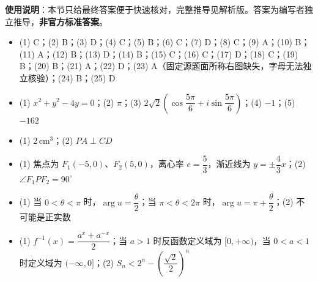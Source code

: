 
\begin{gknotice}
\textbf{使用说明}：本节只给最终答案便于快速核对，完整推导见解析版。答案为编写者独立推导，\textbf{非官方标准答案}。
\end{gknotice}

\begin{itemize}[leftmargin=2.6em]
  \item[\textbf{1.}] (1) C；(2) B；(3) D；(4) C；(5) B；(6) C；(7) D；(8) C；(9) A；(10) B；(11) A；(12) B；(13) D；(14) B；(15) C；(16) C；(17) D；(18) C；(19) B；(20) B；(21) A；(22) D；(23) A（固定源题面所称右图缺失，字母无法独立核验）；(24) B；(25) D
  \item[\textbf{2.}] (1) $x^2+y^2-4y=0$；(2) $\pi$；(3) $2\sqrt2\left(\cos\dfrac{5\pi}{6}+i\sin\dfrac{5\pi}{6}\right)$；(4) $-1$；(5) $-162$
  \item[\textbf{3.}] (1) $2\,\mathrm{cm}^3$；(2) $PA\perp CD$
  \item[\textbf{4.}] (1) 焦点为 $F_1(-5,0)$、$F_2(5,0)$，离心率 $e=\dfrac53$，渐近线为 $y=\pm\dfrac43x$；(2) $\angle F_1PF_2=90^\circ$
  \item[\textbf{5.}] (1) 当 $0<\theta<\pi$ 时，$\arg u=\dfrac\theta2$；当 $\pi<\theta<2\pi$ 时，$\arg u=\pi+\dfrac\theta2$；(2) 不可能是正实数
  \item[\textbf{6.}] (1) $f^{-1}(x)=\dfrac{a^x+a^{-x}}2$；当 $a>1$ 时反函数定义域为 $[0,+\infty)$，当 $0<a<1$ 时定义域为 $(-\infty,0]$；(2) $S_n<2^n-\left(\dfrac{\sqrt2}{2}\right)^n$
\end{itemize}
